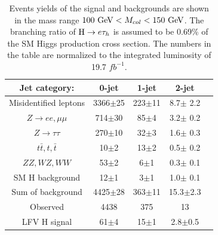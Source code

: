 \begin{table}[htbp]
\centering
\caption{Events yields of the signal and backgrounds are shown in the mass range $100~\textrm{GeV}<M_{col}<150~\textrm{GeV}$. The branching ratio of $\mathrm{H} \to e \tau_{h}$ is assumed to be 0.69\% of the SM Higgs production cross section. The numbers in the table are normalized to the integrated luminosity of 19.7 $fb^{-1}$.}\label{tab:EventYieldTable_100_to_150} 
\begin{tabular}{c|cccl}\hline
Jet category:                     &    0-jet    & 1-jet          & 2-jet          \\\hline
Misidentified leptons           &     3366$\pm$25      & 223$\pm$11     &  8.7$\pm$ 2.2  \\
$Z\to e e, \mu\mu$    &  714$\pm$30       & 85$\pm$4       &  3.2$\pm$ 0.2  \\
$Z\to \tau\tau$           &      270$\pm$10       & 32$\pm$3       &  1.6$\pm$ 0.3  \\
$t\bar{t},t,\bar{t}$      &  10$\pm$2        &  13$\pm$2      &  0.5$\pm$ 0.2   \\
$ ZZ, WZ, WW$        &             53$\pm$2         &  6$\pm$1       &  0.3$\pm$ 0.1   \\
SM H  background     &                12$\pm$1         &  3$\pm$1       &  1.0$\pm$ 0.1   \\
Sum of background       &               4425$\pm$28      & 363$\pm$11     &  15.3$\pm$2.3   \\\hline
Observed                   &            4438             & 375            & 13            \\ \hline
LFV H  signal             &           61$\pm$4        & 15$\pm$1       &  2.8$\pm$0.5    \\\hline
\end{tabular}
\end{table}



